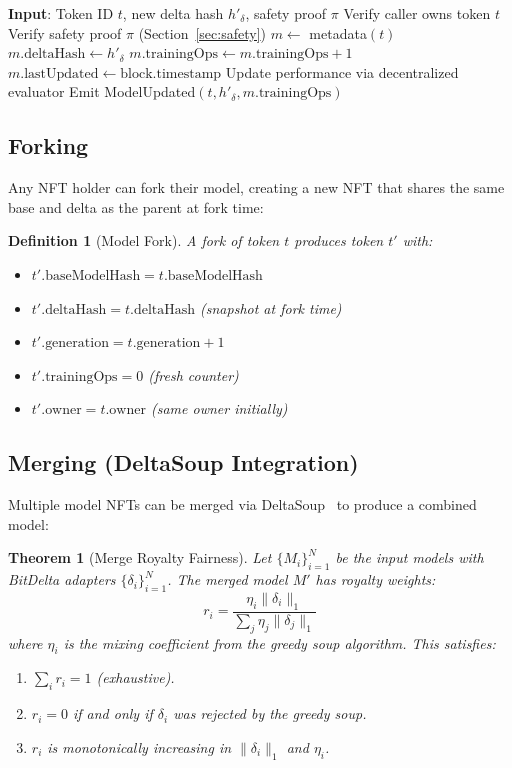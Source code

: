 \documentclass[11pt,letterpaper]{article}
\newtheorem{theorem}{Theorem}[section]
\newtheorem{definition}{Definition}[section]
\begin{document}
\begin{algorithm}[t]
\caption{ZRC-AI Training Update}
\label{alg:update}
\begin{algorithmic}[1]
\STATE \textbf{Input}: Token ID $t$, new delta hash $h'_\delta$, safety proof $\pi$
\STATE Verify caller owns token $t$
\STATE Verify safety proof $\pi$ (Section~\ref{sec:safety})
\STATE $m \leftarrow$ metadata$(t)$
\STATE $m.\text{deltaHash} \leftarrow h'_\delta$
\STATE $m.\text{trainingOps} \leftarrow m.\text{trainingOps} + 1$
\STATE $m.\text{lastUpdated} \leftarrow \text{block.timestamp}$
\STATE Update performance via decentralized evaluator
\STATE Emit ModelUpdated$(t, h'_\delta, m.\text{trainingOps})$
\end{algorithmic}
\end{algorithm}

\subsection{Forking}

Any NFT holder can fork their model, creating a new NFT that shares the same base and delta as the parent at fork time:

\begin{definition}[Model Fork]
A fork of token $t$ produces token $t'$ with:
\begin{itemize}
    \item $t'.\text{baseModelHash} = t.\text{baseModelHash}$
    \item $t'.\text{deltaHash} = t.\text{deltaHash}$ (snapshot at fork time)
    \item $t'.\text{generation} = t.\text{generation} + 1$
    \item $t'.\text{trainingOps} = 0$ (fresh counter)
    \item $t'.\text{owner} = t.\text{owner}$ (same owner initially)
\end{itemize}
\end{definition}

\subsection{Merging (DeltaSoup Integration)}

Multiple model NFTs can be merged via DeltaSoup~\cite{zoo_bitdelta} to produce a combined model:

\begin{theorem}[Merge Royalty Fairness]
\label{thm:merge}
Let $\{M_i\}_{i=1}^N$ be the input models with BitDelta adapters $\{\delta_i\}_{i=1}^N$. The merged model $M'$ has royalty weights:
\[
r_i = \frac{\eta_i \|\delta_i\|_1}{\sum_j \eta_j \|\delta_j\|_1}
\]
where $\eta_i$ is the mixing coefficient from the greedy soup algorithm. This satisfies:
\begin{enumerate}
    \item $\sum_i r_i = 1$ (exhaustive).
    \item $r_i = 0$ if and only if $\delta_i$ was rejected by the greedy soup.
    \item $r_i$ is monotonically increasing in $\|\delta_i\|_1$ and $\eta_i$.
\end{enumerate}
\end{theorem}
\end{document}
